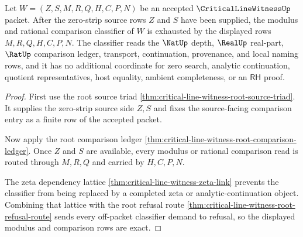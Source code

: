 \begin{theorem}
\label{thm:critical-line-witness-root-modulus-classifier-exactness}
Let $W=(Z,S,M,R,Q,H,C,P,N)$ be an accepted $\CriticalLineWitnessUp$ packet.
After the zero-strip source rows $Z$ and $S$ have been supplied, the modulus
and rational comparison classifier of $W$ is exhausted by the displayed rows
$M,R,Q,H,C,P,N$. The classifier reads the $\NatUp$ depth, $\RealUp$ real-part,
$\RatUp$ comparison ledger, transport, continuation, provenance, and local
naming rows, and it has no additional coordinate for zero search, analytic
continuation, quotient representatives, host equality, ambient completeness,
or an $\mathsf{RH}$ proof.
\end{theorem}
\begin{proof}
First use the root source triad
\autoref{thm:critical-line-witness-root-source-triad}. It supplies the
zero-strip source side $Z,S$ and fixes the source-facing comparison entry as a
finite row of the accepted packet.

Now apply the root comparison ledger
\autoref{thm:critical-line-witness-root-comparison-ledger}. Once $Z$ and $S$
are available, every modulus or rational comparison read is routed through
$M,R,Q$ and carried by $H,C,P,N$.

The zeta dependency lattice
\autoref{thm:critical-line-witness-zeta-link} prevents the classifier from
being replaced by a completed zeta or analytic-continuation object. Combining
that lattice with the root refusal route
\autoref{thm:critical-line-witness-root-refusal-route} sends every off-packet
classifier demand to refusal, so the displayed modulus and comparison rows are
exact.
\end{proof}

